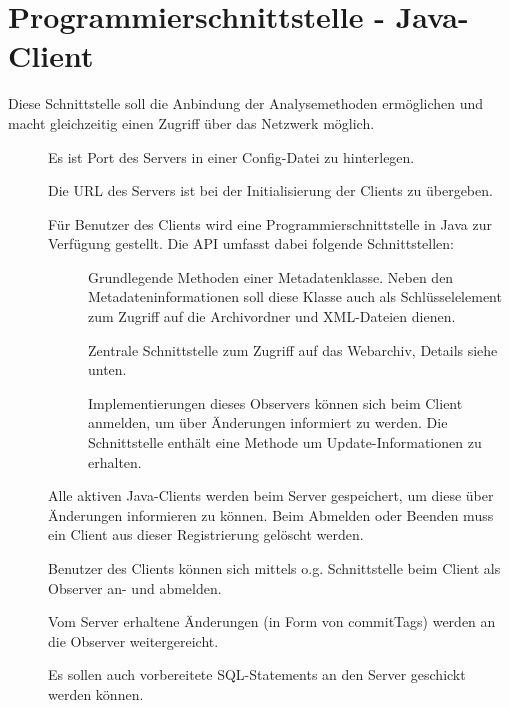 \section{Programmierschnittstelle - Java-Client}\label{spec:client}
	Diese Schnittstelle soll die Anbindung der Analysemethoden ermöglichen und 
	macht gleichzeitig einen Zugriff über das Netzwerk möglich.
\begin{description}
	\item []
		Es ist Port des Servers in einer Config-Datei zu hinterlegen.
	\item []
		Die URL des Servers ist bei der Initialisierung der Clients zu übergeben.
	\item []
		Für Benutzer des Clients wird eine Programmierschnittstelle in Java zur Verfügung gestellt.
		Die API umfasst dabei folgende Schnittstellen:
		\begin{description}
			\item []
				Grundlegende Methoden einer Metadatenklasse.
				Neben den Metadateninformationen soll diese Klasse auch als
				Schlüsselelement zum Zugriff auf die Archivordner und XML-Dateien dienen.
			\item []
				Zentrale Schnittstelle zum Zugriff auf das Webarchiv, Details siehe unten.
			\item []
				Implementierungen dieses Observers können sich beim Client anmelden, 
				um über Änderungen informiert zu werden. 
				Die Schnittstelle enthält eine Methode um Update-Informationen zu erhalten.
		\end{description}
	\item []
		Alle aktiven Java-Clients werden beim Server gespeichert, 
		um diese über Änderungen informieren zu können.
		Beim Abmelden oder Beenden muss ein Client aus dieser Registrierung gelöscht werden.
	\item []
		Benutzer des Clients können sich mittels o.g. Schnittstelle beim Client als Observer an- und abmelden.
	\item []
		Vom Server erhaltene Änderungen (in Form von commitTags) werden an die Observer weitergereicht.
	\item []
		Es sollen auch vorbereitete SQL-Statements an den Server geschickt werden können. 

\end{description}
